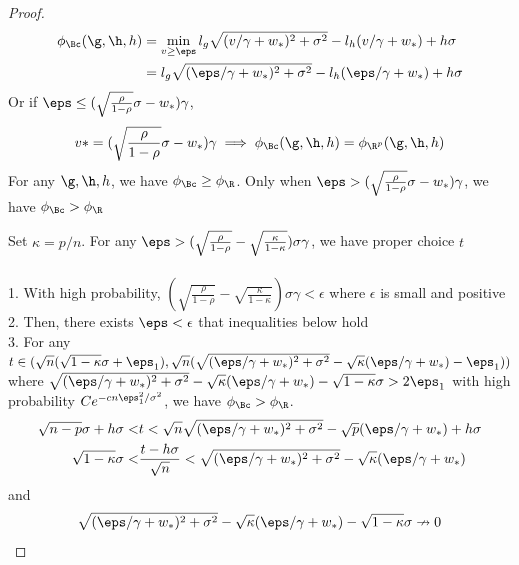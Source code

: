\begin{proof}
\begin{align}
\phi_{\Bc}(\g,\h,h)&=\min_{v\geq\eps}l_g\sqrt{(v/\gamma+w_*)^2+\sigma^2}-l_h(v/\gamma+w_*)+h\sigma\\
&=l_g\sqrt{(\eps/\gamma+w_*)^2+\sigma^2}-l_h(\eps/\gamma+w_*)+h\sigma
\end{align}
Or if $\eps\leq(\sqrt{\frac{\rho}{1-\rho}}\sigma-w_*)\gamma$,
\[
v*=(\sqrt{\frac{\rho}{1-\rho}}\sigma-w_*)\gamma\implies\phi_{\Bc}(\g,\h,h)=\phi_{\R^p}(\g,\h,h)%
\]
{\color{red}
For any $\g,\h,h$, we have $\phi_{\Bc}\geq\phi_{\R}$. Only when $\eps>(\sqrt{\frac{\rho}{1-\rho}}\sigma-w_*)\gamma$, we have $\phi_{\Bc}>\phi_{\R}$
}

Set $\kappa=p/n$. For any $\eps>(\sqrt{\frac{\rho}{1-\rho}}-\sqrt{\frac{\kappa}{1-\kappa}})\sigma\gamma$, we have proper choice $t$
{\color{red}\\\\
1. With high probability, $(\sqrt{\frac{\rho}{1-\rho}}-\sqrt{\frac{\kappa}{1-\kappa}})\sigma\gamma<\epsilon$ where $\epsilon$ is small and positive\\
2. Then, there exists $\eps<\epsilon$ that inequalities below hold\\
3. For any $t\in(\sqrt{n}(\sqrt{1-\kappa}\sigma+\eps_1),\sqrt{n}(\sqrt{(\eps/\gamma+w_*)^2+\sigma^2}-\sqrt{\kappa}(\eps/\gamma+w_*)-\eps_1))$ where $\sqrt{(\eps/\gamma+w_*)^2+\sigma^2}-\sqrt{\kappa}(\eps/\gamma+w_*)-\sqrt{1-\kappa}\sigma>2\eps_1$ with high probability $Ce^{-cn\eps_1^2/\sigma^2}$, we have $\phi_{\Bc}>\phi_{\R}$.
}
\begin{align}
    \sqrt{n-p}\sigma+h\sigma<&t<\sqrt{n}\sqrt{(\eps/\gamma+w_*)^2+\sigma^2}-\sqrt{p}(\eps/\gamma+w_*)+h\sigma\\
    \sqrt{1-\kappa}\sigma<&\frac{t-h\sigma}{\sqrt{n}}<\sqrt{(\eps/\gamma+w_*)^2+\sigma^2}-\sqrt{\kappa}(\eps/\gamma+w_*)
\end{align}
and
\[
\sqrt{(\eps/\gamma+w_*)^2+\sigma^2}-\sqrt{\kappa}(\eps/\gamma+w_*)-\sqrt{1-\kappa}\sigma\nrightarrow0
\]


\end{proof}
